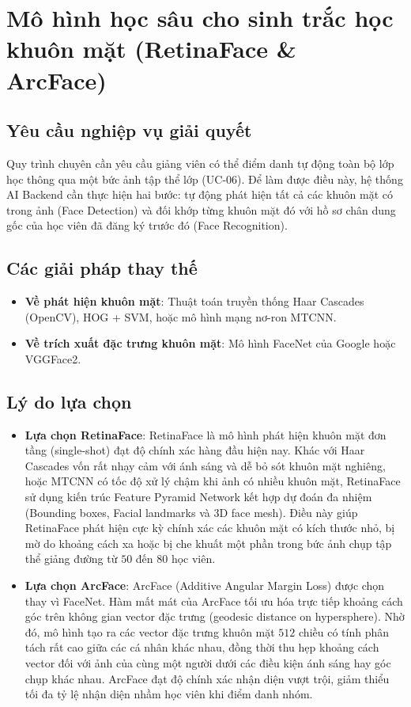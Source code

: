 \documentclass[../DoAn.tex]{subfiles}
\begin{document}
\section{Mô hình học sâu cho sinh trắc học khuôn mặt (RetinaFace \& ArcFace)}
\label{section:3.4}

\subsection{Yêu cầu nghiệp vụ giải quyết}
Quy trình chuyên cần yêu cầu giảng viên có thể điểm danh tự động toàn bộ lớp học thông qua một bức ảnh tập thể lớp (UC-06). Để làm được điều này, hệ thống AI Backend cần thực hiện hai bước: tự động phát hiện tất cả các khuôn mặt có trong ảnh (Face Detection) và đối khớp từng khuôn mặt đó với hồ sơ chân dung gốc của học viên đã đăng ký trước đó (Face Recognition).

\subsection{Các giải pháp thay thế}
\begin{itemize}
    \item \textbf{Về phát hiện khuôn mặt}: Thuật toán truyền thống Haar Cascades (OpenCV), HOG + SVM, hoặc mô hình mạng nơ-ron MTCNN.
    \item \textbf{Về trích xuất đặc trưng khuôn mặt}: Mô hình FaceNet của Google hoặc VGGFace2.
\end{itemize}

\subsection{Lý do lựa chọn}
\begin{itemize}
    \item \textbf{Lựa chọn RetinaFace}: RetinaFace \cite{Deng_2020_CVPR} là mô hình phát hiện khuôn mặt đơn tầng (single-shot) đạt độ chính xác hàng đầu hiện nay. Khác với Haar Cascades vốn rất nhạy cảm với ánh sáng và dễ bỏ sót khuôn mặt nghiêng, hoặc MTCNN có tốc độ xử lý chậm khi ảnh có nhiều khuôn mặt, RetinaFace sử dụng kiến trúc Feature Pyramid Network kết hợp dự đoán đa nhiệm (Bounding boxes, Facial landmarks và 3D face mesh). Điều này giúp RetinaFace phát hiện cực kỳ chính xác các khuôn mặt có kích thước nhỏ, bị mờ do khoảng cách xa hoặc bị che khuất một phần trong bức ảnh chụp tập thể giảng đường từ $50$ đến $80$ học viên.
    \item \textbf{Lựa chọn ArcFace}: ArcFace \cite{Deng_2019_CVPR} (Additive Angular Margin Loss) được chọn thay vì FaceNet. Hàm mất mát của ArcFace tối ưu hóa trực tiếp khoảng cách góc trên không gian vector đặc trưng (geodesic distance on hypersphere). Nhờ đó, mô hình tạo ra các vector đặc trưng khuôn mặt $512$ chiều có tính phân tách rất cao giữa các cá nhân khác nhau, đồng thời thu hẹp khoảng cách vector đối với ảnh của cùng một người dưới các điều kiện ánh sáng hay góc chụp khác nhau. ArcFace đạt độ chính xác nhận diện vượt trội, giảm thiểu tối đa tỷ lệ nhận diện nhầm học viên khi điểm danh nhóm.
\end{itemize}
\end{document}
